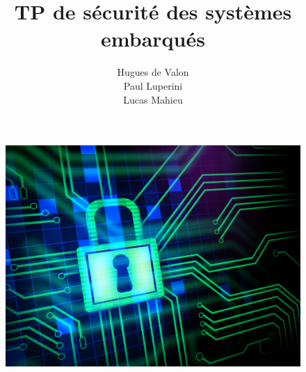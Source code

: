 \documentclass[A4]{article}
\title{TP de sécurité des systèmes embarqués}
\author{Hugues de Valon\\ Paul Luperini\\ Lucas Mahieu}
\begin{document}
\maketitle

\vspace{5cm}

\begin{figure}[h!]
	\begin{center}
	\includegraphics[scale=1.5]{home}
    	\end{center}
\end{figure}

\pagebreak
\tableofcontents

\pagebreak

\end{document}
